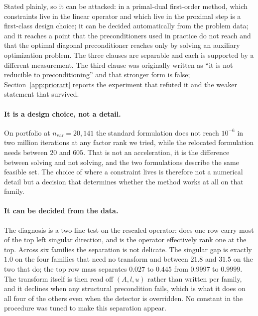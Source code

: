 \documentclass[11pt]{article}
\begin{document}
Stated plainly, so it can be attacked: in a primal-dual first-order method,
which constraints live in the linear operator and which live in the proximal
step is a first-class design choice; it can be decided automatically from the
problem data; and it reaches a point that the preconditioners used in
practice do not reach and that the optimal diagonal preconditioner reaches
only by solving an auxiliary optimization problem. The three clauses are
separable and each is supported by a different measurement. The third clause
was originally written as ``it is not reducible to preconditioning'' and that
stronger form is false; Section~\ref{app:priorart} reports the experiment
that refuted it and the weaker statement that survived.

\paragraph{It is a design choice, not a detail.}
On portfolio at $n_{\mathrm{var}} = 20{,}141$ the standard formulation does
not reach $10^{-6}$ in two million iterations at any factor rank we tried,
while the relocated formulation needs between $20$ and $605$. That is not an
acceleration, it is the difference between solving and not solving, and the
two formulations describe the same feasible set. The choice of where a
constraint lives is therefore not a numerical detail but a decision that
determines whether the method works at all on that family.

\paragraph{It can be decided from the data.}
The diagnosis is a two-line test on the rescaled operator: does one row carry
most of the top left singular direction, and is the operator effectively rank
one at the top. Across six families the separation is not delicate. The
singular gap is exactly $1.0$ on the four families that need no transform and
between $21.8$ and $31.5$ on the two that do; the top row mass separates
$0.027$ to $0.445$ from $0.9997$ to $0.9999$. The transform itself is then
read off $(A, l, u)$ rather than written per family, and it declines when any
structural precondition fails, which is what it does on all four of the
others even when the detector is overridden. No constant in the procedure was
tuned to make this separation appear.
\end{document}
